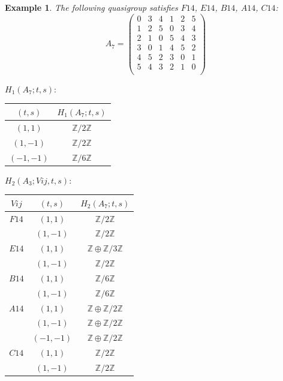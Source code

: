 \documentclass[11pt]{amsart}
\newtheorem{example}[theorem]{Example}
\theoremstyle{definition}
\newcommand{\Z}{\mathbb{Z}}
\begin{document}
\begin{example}
The following quasigroup satisfies 
$F14$, $E14$, $B14$, $A14$, $C14$:
   \[ A_7 = \left(
\begin{array}{cccccc}
 0 & 3 & 4 & 1 & 2 & 5 \\
 1 & 2 & 5 & 0 & 3 & 4 \\
 2 & 1 & 0 & 5 & 4 & 3 \\
 3 & 0 & 1 & 4 & 5 & 2 \\
 4 & 5 & 2 & 3 & 0 & 1 \\
 5 & 4 & 3 & 2 & 1 & 0 \\
\end{array}
\right)\]


\bigskip


$H_1(A_7;t,s):$

\begin{center}
    
\begin{tabular}{c|c}
    $(t,s)$ & $H_1(A_7;t,s)$  \\
    \hline
    $(1,1)$ & $\Z/2\Z$ \\
    $(1,-1)$ & $\Z/2\Z$ \\
    $(-1,-1)$ & $\Z/6\Z$ \\
\end{tabular}
\end{center}
\bigskip

$H_2(A_3;Vij,t,s):$

\begin{center}
    
\begin{tabular}{c|c|c}
    $Vij$ & $(t,s)$ & $H_2(A_7;t,s)$  \\
    \hline

    $F14$ & $(1,1)$ & $\Z/2\Z$ \\
        & $(1,-1)$ & $\Z/2\Z$ \\
    $E14$ & $(1,1)$ & $\Z \oplus \Z/3\Z$ \\
        & $(1,-1)$ & $\Z/2\Z$ \\
    $B14$ & $(1,1)$ & $\Z/6\Z$ \\
        & $(1,-1)$ & $\Z/6\Z$ \\
    $A14$ & $(1,1)$ & $\Z \oplus \Z/2\Z$ \\
        & $(1,-1)$ & $\Z \oplus \Z/2\Z$ \\
        & $(-1,-1)$ & $\Z \oplus \Z/2\Z$ \\
    $C14$ & $(1,1)$ & $\Z/2\Z$ \\
        & $(1,-1)$ & $\Z/2\Z$ \\
\end{tabular}
\end{center}
\end{example}
\end{document}
